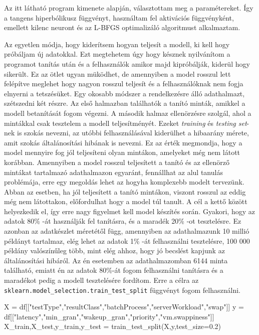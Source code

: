 Az itt látható program kimenete alapján, választottam meg a paramétereket.
Így a tangens hiperbólikusz függvényt, használtam fel aktivációs függvényként, emellett kilenc neuront és az L-BFGS optimalizáló algoritmust alkalmaztam.

Az egyetlen módja, hogy kiderítsem hogyan teljesít a modell, ki kell hogy próbáljam új adatokkal. 
Ezt megtehetem úgy hogy késznek nyilvánítom a programot tanítás után és a felhasználók amikor majd kipróbálják, kiderül hogy sikerült. Ez az ötlet ugyan müködhet, de amennyiben a model rosszul lett felépítve meglehet hogy nagyon rosszul teljesít és a felhasználóknak nem fogja elnyerni a tetszésüket. Egy okosabb módszer a rendelkezésre álló adathalmazt, szétszedni két részre. Az első halmazban találhatók a tanító minták, amikkel a modell betanítását fogom végezni. A második halmaz ellenörzésre szolgál, ahol a mintákkal csak tesztelem a modell teljesítményét.
Ezeket \textit{training} és \textit{testing set}-nek is szokás nevezni, az utóbbi felhasználásával kiderülhet a hibaarány mérete, amit szokás általánosítási hibának is nevezni. Ez az érték megmondja, hogy a model mennyire fog jól teljesíteni olyan mintákon, amelyeket még nem látott korábban.
Amennyiben a model rosszul teljesített a tanító és az ellenörző mintákat tartalmazó adathalmazon egyaránt, fennállhat az alul tanulás problémája, erre egy megoldás lehet az hogyha komplexebb modelt tervezünk. Abban az esetben, ha jól teljesített a tanító mintákon, viszont rosszul az eddig még nem látottakon, előfordulhat hogy a model túl tanult. A cél a kettő között helyezkedik el, így erre nagy figyelmet kell model készítés során.
Gyakori, hogy az adatok 80\% -át használják fel tanításra, és a maradék 20\% -ot tesztelésre. Ez azonban az adatkészlet méretétől függ, amennyiben az adathalmazunk 10 millió példányt tartalmaz, elég lehet az adatok 1\% -át felhasználni tesztelésre, 100 000 példány valószínűleg több, mint
elég ahhoz, hogy jó becslést kapjunk az általánosítási hibáról. Az én esetemben az adathalmazomban 6144 minta található, emiatt én az adatok 80\%-át fogom felhasználni tanításra és a maradékot pedig a modell tesztelésére fordítom. Erre a célra az \texttt{sklearn.model\_selection.train\_test\_split} függvényt fogom felhasználni. 

\begin{python}
X = df[["testType","resultClass","batchProcess","serverWorkload","swap"]]
y = df[["latency","min_gran","wakeup_gran","priority","vm.swappiness"]]
X_train,X_test,y_train,y_test = train_test_split(X,y,test_size=0.2)
\end{python}

